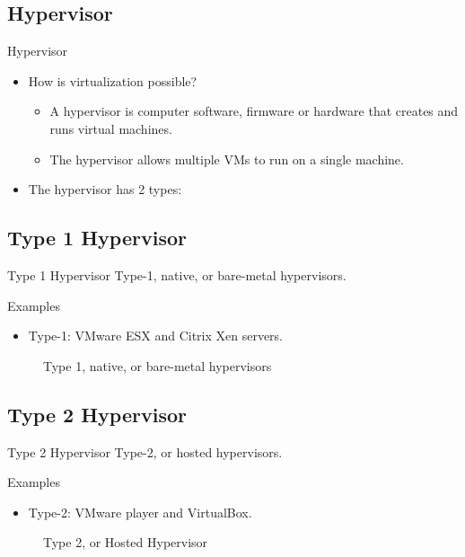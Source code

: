 \subsection{Hypervisor}\label{subsec:hypervisor}
\begin{frame}{Hypervisor}
    \begin{itemize}[<+- | alert@+>]
        \item How is virtualization possible?
        \begin{itemize}
            \item A hypervisor is computer software, firmware or hardware that creates and runs virtual machines.
            \item The hypervisor allows multiple VMs to run on a single machine.
        \end{itemize}
        \item The hypervisor has 2 types:
    \end{itemize}
\end{frame}

\subsection{Type 1 Hypervisor}\label{subsec:type-1-hypervisor}
\begin{frame}{Type 1 Hypervisor}
    Type-1, native, or bare-metal hypervisors.
    \pause
    \begin{block}{Examples}
        \begin{itemize}
            \item Type-1: VMware ESX and Citrix Xen servers.
        \end{itemize}
    \end{block}
    \pause
    \begin{figure}[!t]
        \raggedright
        
        \caption{Type 1, native, or bare-metal hypervisors}
    \end{figure}
\end{frame}

\subsection{Type 2 Hypervisor}\label{subsec:type-2-hypervisor}
\begin{frame}{Type 2 Hypervisor}
    Type-2, or hosted hypervisors.
    \pause
    \begin{block}{Examples}
        \begin{itemize}
            \item Type-2: VMware player and VirtualBox.
        \end{itemize}
    \end{block}
    \pause
    \begin{figure}[!t]
        \raggedright
        
        \caption{Type 2, or Hosted Hypervisor}
    \end{figure}
\end{frame}
